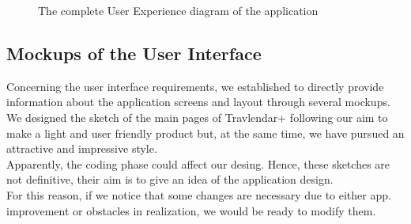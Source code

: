 \begin{figure} 
\begin{center}
\caption{The complete User Experience diagram of the application} 
\label{fig:ux} 
\end{center}
\end{figure} 


\clearpage

\subsection{Mockups of the User Interface}
	\begin{flushleft}
		Concerning the user interface requirements, we established to directly provide information about the application screens and layout through several mockups. \\
		We designed the sketch of the main pages of Travlendar+ following our aim to make a light and user friendly product but, at the same time, we have pursued an attractive and impressive style. \\
		Apparently, the coding phase could affect our desing. Hence, these sketches are not definitive, their aim is to give an idea of the application design. \\
		For this reason, if we notice that some changes are necessary due to either app. improvement or obstacles in realization, we would be ready to modify them. 
	\end{flushleft}
\clearpage

